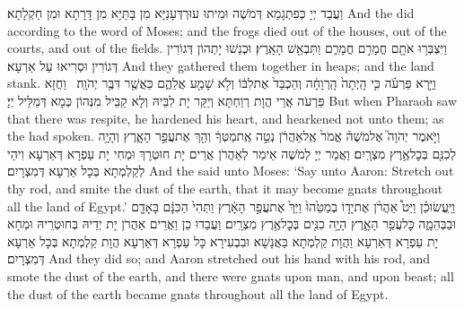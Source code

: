 {וַעֲבַד יְיָ כְּפִתְגָמָא דְּמֹשֶׁה וּמִיתוּ עוּרְדְּעָנַיָּא מִן בָּתַּיָּא מִן דָּרָתָא וּמִן חַקְלָתָא׃}
{And the \lord\space did according to the word of Moses; and the frogs died out of the houses, out of the courts, and out of the fields.}{}
{וַיִּצְבְּר֥וּ אֹתָ֖ם חֳמָרִ֣ם חֳמָרִ֑ם וַתִּבְאַ֖שׁ הָאָֽרֶץ׃}
{וּכְנַשׁוּ יָתְהוֹן דְּגוֹרִין דְּגוֹרִין וּסְרִיאוּ עַל אַרְעָא׃}
{And they gathered them together in heaps; and the land stank.}{}
{וַיַּ֣רְא פַּרְעֹ֗ה כִּ֤י הָֽיְתָה֙ הָֽרְוָחָ֔ה וְהַכְבֵּד֙ אֶת\maqqaf לִבּ֔וֹ וְלֹ֥א שָׁמַ֖ע אֲלֵהֶ֑ם כַּאֲשֶׁ֖ר דִּבֶּ֥ר יְהֹוָֽה׃ \setuma }
{וַחֲזָא פַּרְעֹה אֲרֵי הֲוָת רְוַחְתָּא וְיַקַּר יָת לִבֵּיהּ וְלָא קַבֵּיל מִנְּהוֹן כְּמָא דְּמַלֵּיל יְיָ׃}
{But when Pharaoh saw that there was respite, he hardened his heart, and hearkened not unto them; as the \lord\space had spoken.}{}
{וַיֹּ֣אמֶר יְהֹוָה֮ אֶל\maqqaf מֹשֶׁה֒ אֱמֹר֙ אֶֽל\maqqaf אַהֲרֹ֔ן נְטֵ֣ה אֶֽת\maqqaf מַטְּךָ֔ וְהַ֖ךְ אֶת\maqqaf עֲפַ֣ר הָאָ֑רֶץ וְהָיָ֥ה לְכִנִּ֖ם בְּכׇל\maqqaf אֶ֥רֶץ מִצְרָֽיִם׃}
{וַאֲמַר יְיָ לְמֹשֶׁה אֵימַר לְאַהֲרֹן אֲרֵים יָת חוּטְרָךְ וּמְחִי יָת עַפְרָא דְּאַרְעָא וִיהֵי לְקַלְמְתָא בְּכָל אַרְעָא דְּמִצְרָיִם׃}
{And the \lord\space said unto Moses: ‘Say unto Aaron: Stretch out thy rod, and smite the dust of the earth, that it may become gnats throughout all the land of Egypt.’}{}
{וַיַּֽעֲשׂוּ\maqqaf כֵ֗ן וַיֵּט֩ אַהֲרֹ֨ן אֶת\maqqaf יָד֤וֹ בְמַטֵּ֙הוּ֙ וַיַּךְ֙ אֶת\maqqaf עֲפַ֣ר הָאָ֔רֶץ וַתְּהִי֙ הַכִּנָּ֔ם בָּאָדָ֖ם וּבַבְּהֵמָ֑ה כׇּל\maqqaf עֲפַ֥ר הָאָ֛רֶץ הָיָ֥ה כִנִּ֖ים בְּכׇל\maqqaf אֶ֥רֶץ מִצְרָֽיִם׃}
{וַעֲבַדוּ כֵן וַאֲרֵים אַהֲרֹן יָת יְדֵיהּ בְּחוּטְרֵיהּ וּמְחָא יָת עַפְרָא דְּאַרְעָא וַהֲוָת קַלְמְתָא בַּאֲנָשָׁא וּבִבְעִירָא כָּל עַפְרָא דְּאַרְעָא הֲוָת קַלְמְתָא בְּכָל אַרְעָא דְּמִצְרָיִם׃}
{And they did so; and Aaron stretched out his hand with his rod, and smote the dust of the earth, and there were gnats upon man, and upon beast; all the dust of the earth became gnats throughout all the land of Egypt.}{}
